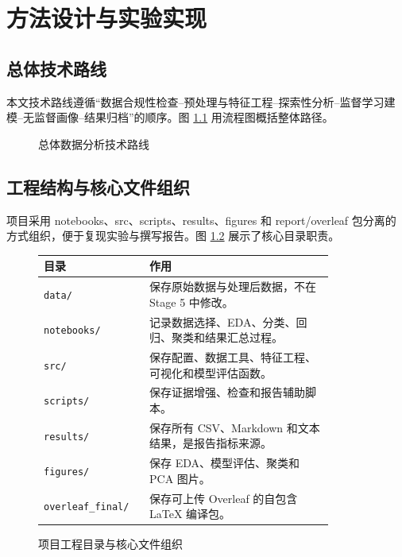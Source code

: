 \chapter{方法设计与实验实现}

\section{总体技术路线}

本文技术路线遵循“数据合规性检查--预处理与特征工程--探索性分析--监督学习建模--无监督画像--结果归档”的顺序。图 \ref{fig:analysis-pipeline-diagram} 用流程图概括整体路径。

\begin{figure}[H]
\centering
{}
\caption{总体数据分析技术路线}
\label{fig:analysis-pipeline-diagram}
\end{figure}

\section{工程结构与核心文件组织}

项目采用 notebooks、src、scripts、results、figures 和 report/overleaf 包分离的方式组织，便于复现实验与撰写报告。图 \ref{fig:project-structure-diagram} 展示了核心目录职责。

\begin{figure}[H]
\centering
\begin{tabular}{p{0.28\linewidth}p{0.58\linewidth}}
\toprule
目录 & 作用 \\
\midrule
\texttt{data/} & 保存原始数据与处理后数据，不在 Stage 5 中修改。\\
\texttt{notebooks/} & 记录数据选择、EDA、分类、回归、聚类和结果汇总过程。\\
\texttt{src/} & 保存配置、数据工具、特征工程、可视化和模型评估函数。\\
\texttt{scripts/} & 保存证据增强、检查和报告辅助脚本。\\
\texttt{results/} & 保存所有 CSV、Markdown 和文本结果，是报告指标来源。\\
\texttt{figures/} & 保存 EDA、模型评估、聚类和 PCA 图片。\\
\texttt{overleaf\_final/} & 保存可上传 Overleaf 的自包含 LaTeX 编译包。\\
\bottomrule
\end{tabular}
\caption{项目工程目录与核心文件组织}
\label{fig:project-structure-diagram}
\end{figure}

